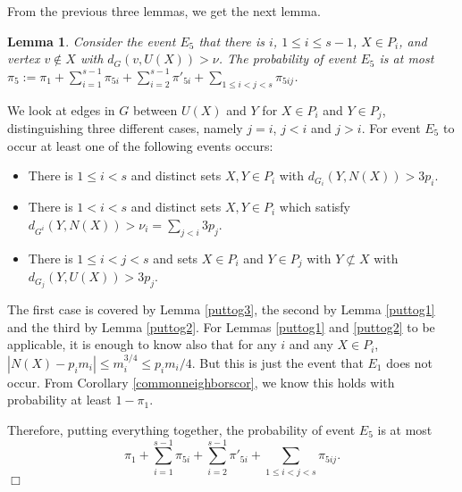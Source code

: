 \documentclass[11pt]{article}
\newtheorem{lemma}{Lemma}[section]
\newenvironment{proof}
      {\medskip\noindent{\bf Proof:}\hspace{1mm}}
      {\hfill$\Box$\medskip}
\begin{document}
From the previous three lemmas, we get the next lemma.

\begin{lemma}\label{puttog}
Consider the event $E_5$ that there
is $i$, $1 \leq i \leq s - 1$, $X \in P_i$, and vertex $v \not \in X$ with
$d_G(v,U(X)) > \nu$. The probability of event $E_5$ is at most
$\pi_5:=\pi_1+\sum_{i=1}^{s-1}\pi_{5i}+\sum_{i=2}^{s-1}\pi'_{5i}+\sum_{1 \leq i
< j < s}\pi_{5ij}$.
\end{lemma}
\begin{proof}
We look at edges in $G$ between $U(X)$ and $Y$ for $X \in P_i$ and $Y \in P_j$,
distinguishing three different cases, namely $j = i$, $j<i$ and $j>i$. For
event $E_5$ to occur at least one of the following events occurs:
\begin{itemize}
\item There is $1 \leq i < s$ and distinct sets $X,Y \in P_i$ with
$d_{G_i}(Y,N(X))>3p_i$.
\item There is $1 < i < s$ and distinct sets $X,Y \in P_i$ which satisfy
$d_{G^i}(Y,N(X))>\nu_i=\sum_{j<i}3p_j$.
\item There is $1 \leq i < j < s$ and sets $X \in P_i$ and $Y \in P_j$ with $Y
\not \subset X$ with
$d_{G_j}(Y,U(X))>3p_j$.
\end{itemize}

The first case is covered by Lemma \ref{puttog3}, the second by Lemma
\ref{puttog1} and the third by Lemma \ref{puttog2}. For Lemmas \ref{puttog1}
and \ref{puttog2} to be applicable, it is enough to know also that for any $i$
and any $X \in P_i$, $|N(X) - p_i m_i| \leq m_i^{3/4} \leq p_i m_i/4$. But this
is just the event that $E_1$ does not occur. From Corollary
\ref{commonneighborscor}, we know this holds with probability at least $1 -
\pi_1$.

Therefore, putting everything together, the probability of event $E_5$ is at
most
$$\pi_1+\sum_{i=1}^{s-1}\pi_{5i}+\sum_{i=2}^{s-1}\pi'_{5i}+\sum_{1 \leq i < j <
s}\pi_{5ij}.$$
\end{proof}
\end{document}
